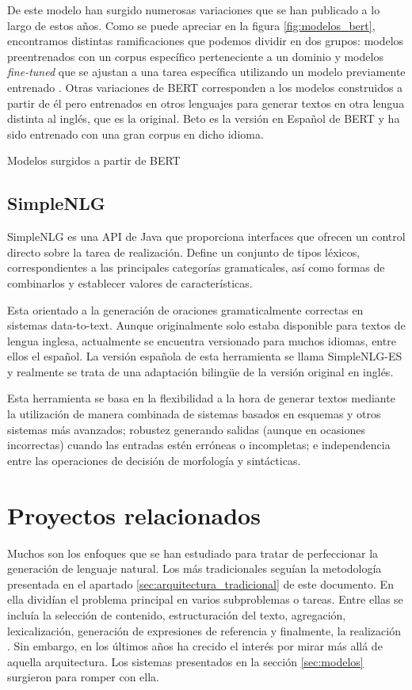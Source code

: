 De este modelo han surgido numerosas variaciones que se han publicado a lo largo de estos años. Como se puede apreciar en la figura \ref{fig:modelos_bert}, encontramos distintas ramificaciones que podemos dividir en dos grupos: modelos preentrenados con un corpus específico perteneciente a un dominio y modelos \textit{fine-tuned} que se ajustan a una tarea específica utilizando un modelo previamente entrenado \citep{rajasekharan_2019}.
Otras variaciones de BERT corresponden a los modelos construidos a partir de él pero entrenados en otros lenguajes para generar textos en otra lengua distinta al inglés, que es la original. Beto es la versión en Español de BERT \citep{CaneteCFP2020} y ha sido entrenado con una gran corpus en dicho idioma.

%
{Modelos surgidos a partir de BERT}


\subsection{SimpleNLG}
SimpleNLG es una API de Java que proporciona interfaces que ofrecen un control directo sobre la tarea de realización. Define un conjunto de tipos léxicos, correspondientes a las principales categorías gramaticales, así como formas de combinarlos y establecer valores de características. 

Esta orientado a la generación de oraciones gramaticalmente correctas en sistemas data-to-text. Aunque originalmente solo estaba disponible para textos de lengua inglesa, actualmente se encuentra versionado para muchos idiomas, entre ellos el español. La versión española de esta herramienta se llama SimpleNLG-ES y realmente se trata de una adaptación bilingüe de la versión original en inglés.

Esta herramienta se basa en la flexibilidad a la hora de generar textos mediante la utilización de manera combinada de sistemas basados en esquemas y otros sistemas más avanzados; robustez generando salidas (aunque en ocasiones incorrectas) cuando las entradas estén erróneas o incompletas; e independencia entre las operaciones de decisión de morfología y sintácticas.

\section{Proyectos relacionados}
Muchos son los enfoques que se han estudiado para tratar de perfeccionar la generación de lenguaje natural. Los más tradicionales seguían la metodología presentada en el apartado \ref{sec:arquitectura_tradicional} de este documento. En ella dividían el problema principal en varios subproblemas o tareas. Entre ellas se incluía la selección de contenido, estructuración del texto, agregación, lexicalización, generación de expresiones de referencia y finalmente, la realización \citep{reiter1997building}. Sin embargo, en los últimos años ha crecido el interés por mirar más allá de aquella arquitectura. Los sistemas presentados en la sección \ref{sec:modelos} surgieron para romper con ella.


